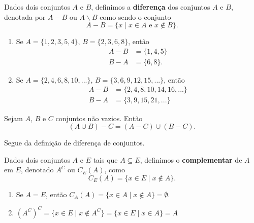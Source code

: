 \begin{definicao}
	Dados dois conjuntos $A$ e $B$, definimos a \textbf{diferen{\c c}a} dos conjuntos $A$ e $B$, denotada por $A-B$ ou $A\backslash B$ como sendo o conjunto
	\[
		A - B = \{x \mid x \in A \mbox{ e } x \notin B\}.
	\]
\end{definicao}

\begin{exemplos}
	\begin{enumerate}[label={\arabic*})]
		\item Se $A=\{1,2,3,5,4\}$, $B=\{2,3,6,8\}$, então
		\begin{align*}
			A - B &= \{1,4,5\}\\
			B - A &=\{6,8\}.
		\end{align*}
		\item Se $A=\{2,4,6,8,10,...\}$, $B=\{3,6,9,12,15,...\}$, então
		\begin{align*}
		 	A - B &= \{2,4,8,10,14,16,...\}\\
		 	B - A &= \{3,9,15,21,...\}
		 \end{align*}
	\end{enumerate}
	
\end{exemplos}

\begin{proposicao}
	Sejam $A$, $B$ e $C$ conjuntos n\~ao vazios. Ent\~ao
	\[(A \cup B) - C = (A - C) \cup (B - C).\]
\end{proposicao}
\begin{prova}
	Segue da defini\c{c}\~ao de diferen\c{c}a de conjuntos.
\end{prova}

\begin{definicao}
Dados dois conjuntos $A$ e $E$ tais que $A\subseteq E$, definimos o \textbf{complementar} de $A$ em $E$, denotado $A^C$ ou $C_E(A)$, como
\[
	C_E(A) = \{ x \in E \mid x \notin A \}.
\]
\end{definicao}

\begin{observacoes}
	\begin{enumerate}[label={\arabic*})]
		\item Se $A = E$, ent{\~a}o $C_A(A) = \{ x \in A \mid x \notin A \} = \emptyset$.
		\item $(A^C)^C = \{x \in E \mid x \notin A^C\} = \{ x \in E \mid x \in A \} = A$
	\end{enumerate}
	
\end{observacoes}

